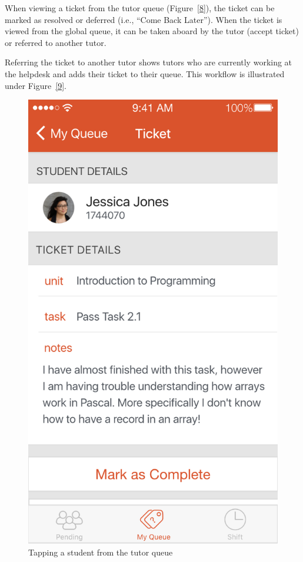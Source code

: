 \documentclass[a4paper,12pt]{article}
\begin{document}
When viewing a ticket from the tutor queue (Figure~\ref{8}), the ticket can be marked as
resolved or deferred (i.e., ``Come Back Later''). When the ticket is
viewed from the global queue, it can be taken aboard by the tutor
(accept ticket) or referred to another tutor.

Referring the ticket to another tutor shows tutors who are currently
working at the helpdesk and adds their ticket to their queue. This workflow
is illustrated under Figure~\ref{9}.

\begin{figure}[p]
\centering
\includegraphics[scale=0.5]{35ca916310.png}
\caption{Tapping a student from the tutor queue}
\label{7}
\end{figure}
\end{document}
